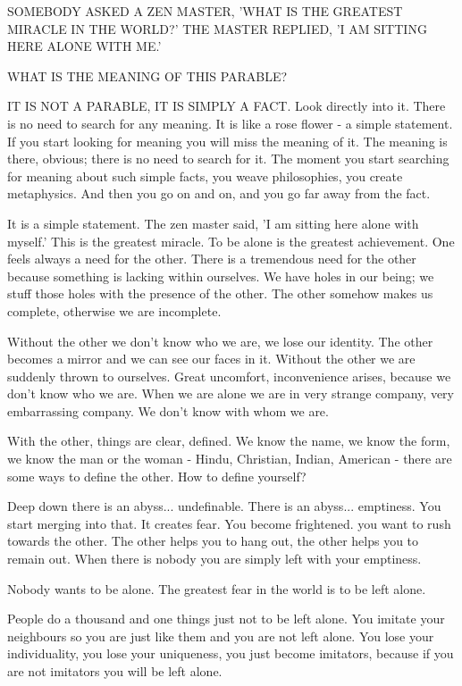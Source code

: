 SOMEBODY ASKED A ZEN MASTER, 'WHAT IS THE GREATEST MIRACLE
IN THE WORLD?' THE MASTER REPLIED, 'I AM SITTING HERE ALONE
WITH ME.'

WHAT IS THE MEANING OF THIS PARABLE?

IT IS NOT A PARABLE, IT IS SIMPLY A FACT. Look directly into it. There is no need to search for any meaning. It is like a rose flower - a simple statement. If you start looking for meaning you will miss the meaning of it. The meaning is there, obvious; there is no need to search for it. The moment you start searching for meaning about such simple facts, you weave philosophies, you create metaphysics. And then you go on and on, and you go far away from the fact.

It is a simple statement. The zen master said, 'I am sitting here alone with myself.' This is the greatest miracle. To be alone is the greatest achievement. One feels always a need for the other. There is a tremendous need for the other because something is lacking within ourselves. We have holes in our being; we stuff those holes with the presence of the other. The other somehow makes us complete, otherwise we are incomplete.

Without the other we don't know who we are, we lose our identity. The other becomes a mirror and we can see our faces in it. Without the other we are suddenly thrown to ourselves. Great uncomfort, inconvenience arises, because we don't know who we are. When we are alone we are in very strange company, very embarrassing company. We don't know with whom we are.

With the other, things are clear, defined. We know the name, we know the form, we know the man or the woman - Hindu, Christian, Indian, American - there are some ways to define the other. How to define yourself?

Deep down there is an abyss... undefinable. There is an abyss... emptiness. You start merging into that. It creates fear. You become frightened. you want to rush towards the other. The other helps you to hang out, the other helps you to remain out. When there is nobody you are simply left with your emptiness.

Nobody wants to be alone. The greatest fear in the world is to be left alone.

People do a thousand and one things just not to be left alone. You imitate your neighbours so you are just like them and you are not left alone. You lose your individuality, you lose your uniqueness, you just become imitators, because if you are not imitators you will be left alone.

